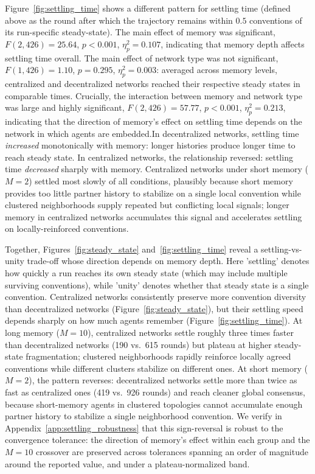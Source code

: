 \documentclass{article}
\begin{document}
Figure~\ref{fig:settling_time} shows a different pattern for settling time (defined above as the round after which the trajectory remains within $0.5$ conventions of its run-specific steady-state). The main effect of memory was significant, $F(2, 426) = 25.64$, $p < 0.001$, $\eta_p^2 = 0.107$, indicating that memory depth affects settling time overall. The main effect of network type was not significant, $F(1, 426) = 1.10$, $p = 0.295$, $\eta_p^2 = 0.003$: averaged across memory levels, centralized and decentralized networks reached their respective steady states in comparable times. Crucially, the interaction between memory and network type was large and highly significant, $F(2, 426) = 57.77$, $p < 0.001$, $\eta_p^2 = 0.213$, indicating that the direction of memory's effect on settling time depends on the network in which agents are embedded.In decentralized networks, settling time \emph{increased} monotonically with memory: longer histories produce longer time to reach steady state. In centralized networks, the relationship reversed: settling time \emph{decreased} sharply with memory. Centralized networks under short memory ($M=2$) settled most slowly of all conditions, plausibly because short memory provides too little partner history to stabilize on a single local convention while clustered neighborhoods supply repeated but conflicting local signals; longer memory in centralized networks accumulates this signal and accelerates settling on locally-reinforced conventions.

Together, Figures~\ref{fig:steady_state} and~\ref{fig:settling_time} reveal a settling-vs-unity trade-off whose direction depends on memory depth. Here 'settling' denotes how quickly a run reaches its own steady state (which may include multiple surviving conventions), while 'unity' denotes whether that steady state is a single convention. Centralized networks consistently preserve more convention diversity than decentralized networks (Figure~\ref{fig:steady_state}), but their settling speed depends sharply on how much agents remember (Figure~\ref{fig:settling_time}). At long memory ($M=10$), centralized networks settle roughly three times faster than decentralized networks (190 vs.\ 615 rounds) but plateau at higher steady-state fragmentation; clustered neighborhoods rapidly reinforce locally agreed conventions while different clusters stabilize on different ones. At short memory ($M=2$), the pattern reverses: decentralized networks settle more than twice as fast as centralized ones (419 vs.\ 926 rounds) and reach cleaner global consensus, because short-memory agents in clustered topologies cannot accumulate enough partner history to stabilize a single neighborhood convention. We verify in Appendix~\ref{app:settling_robustness} that this sign-reversal is robust to the convergence tolerance: the direction of memory's effect within each group and the $M=10$ crossover are preserved across tolerances spanning an order of magnitude around the reported value, and under a plateau-normalized band.
\end{document}
